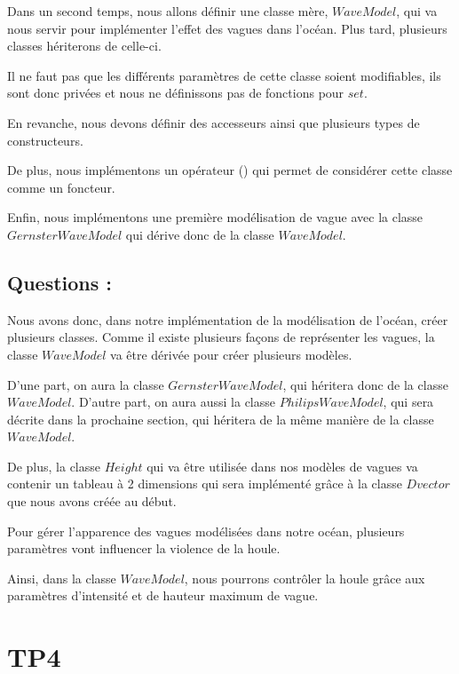 \documentclass{article}
\begin{document}
Dans un second temps,  nous allons définir une classe mère, $WaveModel$, qui va nous servir pour implémenter l'effet des vagues dans l'océan. Plus tard, plusieurs classes hériterons de celle-ci.

Il ne faut pas que les différents paramètres de cette classe soient modifiables, ils sont donc privées et nous ne définissons pas de fonctions pour $set$.

En revanche, nous devons définir des accesseurs ainsi que plusieurs types de constructeurs.

De plus, nous implémentons un opérateur () qui permet de considérer cette classe comme un foncteur.

Enfin, nous implémentons une première modélisation de vague avec la classe $GernsterWaveModel$ qui dérive donc de la classe $WaveModel$.

\vspace{0.5cm}

\subsection{Questions :}

Nous avons donc, dans notre implémentation de la modélisation de l'océan, créer plusieurs classes. Comme il existe plusieurs façons de représenter les vagues, la classe $WaveModel$ va être dérivée pour créer plusieurs modèles.

D'une part, on aura la classe $GernsterWaveModel$, qui héritera donc de la classe $WaveModel$. D'autre part, on aura aussi la classe $PhilipsWaveModel$, qui sera décrite dans la prochaine section, qui héritera de la même manière de la classe $WaveModel$.

De plus, la classe $Height$ qui va être utilisée dans nos modèles de vagues va contenir un tableau à 2 dimensions qui sera implémenté grâce à la classe $Dvector$ que nous avons créée au début.

\vspace{1cm}


Pour gérer l'apparence des vagues modélisées dans notre océan, plusieurs paramètres vont influencer la violence de la houle.

Ainsi, dans la classe $WaveModel$, nous pourrons contrôler la houle grâce aux paramètres d'intensité et de hauteur maximum de vague.

\vspace{1cm}

\section{TP4}
\end{document}
